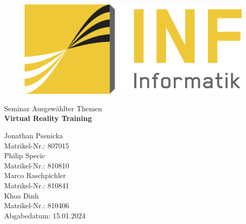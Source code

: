 \begin{titlepage}
    \begin{figure}
        \begin{flushright}
            \includegraphics[scale=0.75]{images/INFLogo.png}
        \end{flushright}
    \end{figure}

    {\centering

    \vspace{4.5cm}
    {\Large Seminar Ausgewählter Themen}\\
    \vspace{1.5cm}
    {\LARGE{\textbf{Virtual Reality Training}}}\\
    \vspace{2cm}

    \vspace{1.0cm}
    Jonathan Psenicka\\
    Matrikel-Nr.: 807015\\
    \vspace{2.0cm}
    Philip Specic\\
    Matrikel-Nr.: 810810\\
    \vspace{2.0cm}
    Marco Raschpichler\\
    Matrikel-Nr.: 810841\\
    \vspace{2.0cm}
    Khoa Dinh\\
    Matrikel-Nr.: 810406\\
    \vspace{1.5cm}
    {\small Abgabedatum: 15.01.2024}\\
    \vspace{1.5cm}
    }

\end{titlepage}
